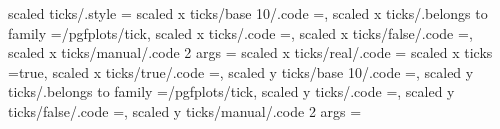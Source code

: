 scaled ticks/.style                                                ={                                                                                                                                 
scaled x ticks/base 10/.code                                       ={\def\pgfplots@scaled@ticks@x@choice{2}\def\pgfplots@scaled@ticks@x@arg{#1}},                                                      
scaled x ticks/.belongs to family                                  =/pgfplots/tick,                                                                                                                    
scaled x ticks/.code                                               ={},                                                                                           
scaled x ticks/false/.code                                         ={\def\pgfplots@scaled@ticks@x@choice{0}},                                                                                          
scaled x ticks/manual/.code 2 args                                 ={                                                                                                                                 
scaled x ticks/real/.code                                          ={                                                                                                                                 
scaled x ticks                                                     =true,                                                                                                                              
scaled x ticks/true/.code                                          ={\def\pgfplots@scaled@ticks@x@choice{1}},                                                                                          
scaled y ticks/base 10/.code                                       ={\def\pgfplots@scaled@ticks@y@choice{2}\def\pgfplots@scaled@ticks@y@arg{#1}},                                                      
scaled y ticks/.belongs to family                                  =/pgfplots/tick,                                                                                                                    
scaled y ticks/.code                                               ={},                                                                                           
scaled y ticks/false/.code                                         ={\def\pgfplots@scaled@ticks@y@choice{0}},                                                                                          
scaled y ticks/manual/.code 2 args                                 ={                                                                                                                                 
}}}}
